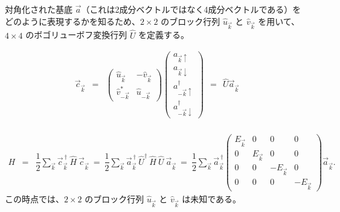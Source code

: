 \documentclass[uplatex,a4j,12pt,dvipdfmx]{jsarticle}
\begin{document}
対角化された基底 $\vec{a}$（これは2成分ベクトルではなく4成分ベクトルである）をどのように表現するかを知るため、$2 \times 2$ のブロック行列 $\hat{u}_{\vec{k}}$ と $\hat{v}_{\vec{k}}$ を用いて、$4 \times 4$ のボゴリューボフ変換行列 $\hat{U}$ を定義する。

\begin{eqnarray}
	\vec{c}_{\vec{k}}
	&=&
	\left(
	\begin{array}{cc}
			\hat{u}_{\vec{k}}       & - \hat{v}_{\vec{k}} \\[3mm]
			\hat{v}_{- \vec{k}}^{*} & \hat{u}_{- \vec{k}}
		\end{array}
	\right)
	\!\!\!
	\left(
	\begin{array}{c}
			a_{\vec{k} \uparrow}            \\[2mm]
			a_{\vec{k} \downarrow}          \\[2mm]
			a^{\dagger}_{-\vec{k} \uparrow} \\[2mm]
			a^{\dagger}_{-\vec{k} \downarrow}
		\end{array}
	\right)
	\ \ = \ \
	\hat{U}
	\vec{a}_{\vec{k}}
\end{eqnarray}
%
\ \\[-10mm]

\begin{eqnarray}
	H
	&=&
	\dfrac{1}{2}
	\sum_{\vec{k}}
	\vec{c}^{\ \dagger}_{\vec{k}}
	\
	\hat{H}
	\
	\vec{c}_{\vec{k}}
	\ = \
	\dfrac{1}{2}
	\sum_{\vec{k}}
	\vec{a}^{\ \dagger}_{\vec{k}}
	\
	\hat{U}^{\dagger}
	\
	\hat{H}
	\
	\hat{U}
	\
	\vec{a}_{\vec{k}}
	\ = \
	\dfrac{1}{2}
	\sum_{\vec{k}}
	\vec{a}^{\ \dagger}_{\vec{k}}
	\left(
	\begin{array}{cccc}
			E_{\vec{k}} & 0           & 0             & 0
			\\[3mm]
			0           & E_{\vec{k}} & 0             & 0
			\\[3mm]
			0           & 0           & - E_{\vec{k}} & 0
			\\[3mm]
			0           & 0           & 0             & - E_{\vec{k}}
		\end{array}
	\right)
	\vec{a}_{\vec{k}}
	.
\end{eqnarray}
%
この時点では、$2 \times 2$ のブロック行列 $\hat{u}_{\vec{k}}$ と $\hat{v}_{\vec{k}}$ は未知である。
\end{document}
